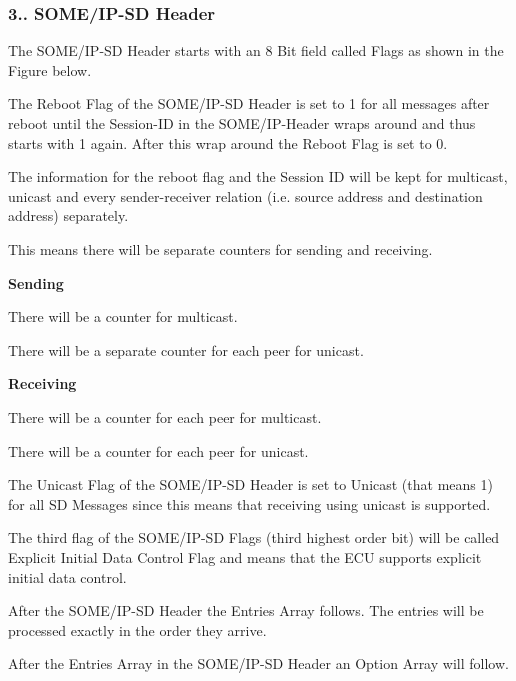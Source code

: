 \subsubsection*{3.. S\+O\+M\+E/\+I\+P-\/\+SD Header}


\begin{DoxyItemize}
\item The S\+O\+M\+E/\+I\+P-\/\+SD Header starts with an 8 Bit field called Flags as shown in the Figure below. 
\item The Reboot Flag of the S\+O\+M\+E/\+I\+P-\/\+SD Header is set to 1 for all messages after reboot until the Session-\/\+ID in the S\+O\+M\+E/\+I\+P-\/\+Header wraps around and thus starts with 1 again. After this wrap around the Reboot Flag is set to 0.
\item The information for the reboot flag and the Session ID will be kept for multicast, unicast and every sender-\/receiver relation (i.\+e. source address and destination address) separately.
\item This means there will be separate counters for sending and receiving.
\item {\bfseries Sending}
\begin{DoxyItemize}
\item There will be a counter for multicast.
\item There will be a separate counter for each peer for unicast.
\end{DoxyItemize}
\item {\bfseries Receiving}
\begin{DoxyItemize}
\item There will be a counter for each peer for multicast.
\item There will be a counter for each peer for unicast.
\end{DoxyItemize}
\item The Unicast Flag of the S\+O\+M\+E/\+I\+P-\/\+SD Header is set to Unicast (that means 1) for all SD Messages since this means that receiving using unicast is supported.
\item The third flag of the S\+O\+M\+E/\+I\+P-\/\+SD Flags (third highest order bit) will be called Explicit Initial Data Control Flag and means that the E\+CU supports explicit initial data control.
\item After the S\+O\+M\+E/\+I\+P-\/\+SD Header the Entries Array follows. The entries will be processed exactly in the order they arrive.
\item After the Entries Array in the S\+O\+M\+E/\+I\+P-\/\+SD Header an Option Array will follow.
\end{DoxyItemize}

